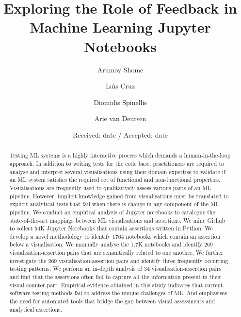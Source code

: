 \title{Exploring the Role of Feedback in Machine Learning Jupyter Notebooks}


\author{Arumoy Shome\and
  Lu{\`\i}s Cruz\and
  Diomidis Spinellis\and
  Arie van Deursen
}



\date{Received: date / Accepted: date}


\maketitle

\begin{abstract}

Testing ML systems is a highly interactive process which demands a human-in-the-loop approach. In addition to writing tests for the code base, practitioners are required to analyse and interpret several visualisations using their domain expertise to validate if an ML system satisfies the required set of functional and non-functional properties. Visualisations are frequently used to qualitatively assess various parts of an ML pipeline. However, implicit knowledge gained from visualisations must be translated to explicit analytical tests that fail when there is change in any component of the ML pipeline. We conduct an empirical analysis of Jupyter notebooks to catalogue the state-of-the-art mappings between ML visualisations and assertions. We mine Github to collect 54K Jupyter Notebooks that contain assertions written in Python. We develop a novel methodology to identify 1764 notebooks which contain an assertion below a visualisation. We manually analyse the 1.7K notebooks and identify 269 visualisation-assertion pairs that are semantically related to one another. We further investigate the 269 visualisation-assertion pairs and identify three frequently occurring testing patterns. We perform an in-depth analysis of 34 visualisation-assertion pairs and find that the assertions often fail to capture all the information present in their visual counter-part. Empirical evidence obtained in this study indicates that current software testing methods fail to address the unique challenges of ML. And emphasises the need for automated tools that bridge the gap between visual assessments and analytical assertions.

\end{abstract}


